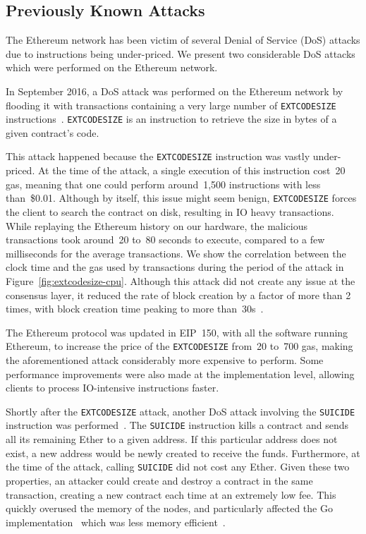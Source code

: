 \subsection{Previously Known Attacks}
The Ethereum network has been victim of several Denial of Service (DoS) attacks due to instructions being under-priced. We present two considerable DoS attacks which were performed on the Ethereum network.

In September 2016, a DoS attack was performed on the Ethereum network by flooding it with transactions containing a very large number of \lstinline{EXTCODESIZE} instructions~\cite{transaction-spam-attack}. \lstinline{EXTCODESIZE} is an instruction to retrieve the size in bytes of a given contract's code.

This attack happened because the \lstinline{EXTCODESIZE} instruction was vastly under-priced. At the time of the attack, a single execution of this instruction cost~20 gas, meaning that one could perform around~1,500 instructions with less than~\$0.01. Although by itself, this issue might seem benign, \lstinline{EXTCODESIZE} forces the client to search the contract on disk, resulting in IO heavy transactions. While replaying the Ethereum history on our hardware, the malicious transactions took around~20 to~80 seconds to execute, compared to a few milliseconds for the average transactions. We show the correlation between the clock time and the gas used by transactions during the period of the attack in Figure~\ref{fig:extcodesize-cpu}. Although this attack did not create any issue at the consensus layer, it reduced the rate of block creation by a factor of more than 2 times, with block creation time peaking to more than~30s~\cite{block-time-chart}.

The Ethereum protocol was updated in EIP~150, with all the software running Ethereum, to increase the price of the \lstinline{EXTCODESIZE} from~20 to~700 gas, making the aforementioned attack considerably more expensive to perform. Some performance improvements were also made at the implementation level, allowing clients to process IO-intensive instructions faster.

Shortly after the \lstinline{EXTCODESIZE} attack, another DoS attack involving the \lstinline{SUICIDE} instruction was performed~\cite{suicide-attack}. The \lstinline{SUICIDE} instruction kills a contract and sends all its remaining Ether to a given address. If this particular address does not exist, a new address would be newly created to receive the funds. Furthermore, at the time of the attack, calling \lstinline{SUICIDE} did not cost any Ether. Given these two properties, an attacker could create and destroy a contract in the same transaction, creating a new contract each time at an extremely low fee. This quickly overused the memory of the nodes, and particularly affected the Go implementation~\cite{geth} which was less memory efficient~\cite{geth-memory-efficiency}.

